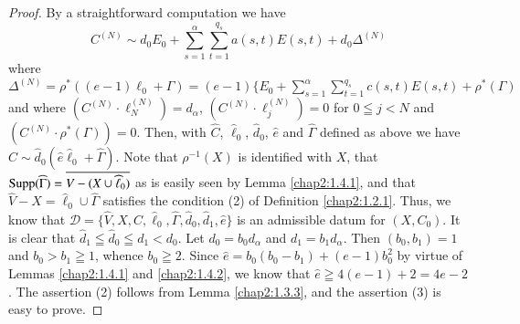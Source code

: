 \begin{proof}
By a straightforward computation we have
$$
C^{(N)}\sim
d_{0}E_{0}+\sum^{\alpha}_{s=1}\sum^{q_{s}}_{t=1}a(s,t)E(s,t)+d_{0}\Delta^{(N)}
$$
where
$\Delta^{(N)}=\rho^{\ast}((e-1)\ell_{0}+\Gamma)=(e-1)\{E_{0}+{\displaystyle{\mathop{\sum}^{\alpha}_{s=1}}\mathop{\sum}^{q_{s}}_{t=1}}c(s,t)E(s,t)+\rho^{\ast}(\Gamma)$
and where $(C^{(N)}\cdot\ell^{(N)}_{N})=d_{\alpha}$,
$(C^{(N)}\cdot\ell^{(N)}_{j})=0$ for $0\leqq j<N$ and $(C^{(N)}\cdot
\rho^{\ast}(\Gamma))=0$. Then, with $\widehat{C}$,
$\widehat{\ell}_{0}$, $\widehat{d}_{0}$, $\widehat{e}$ and
$\widehat{\Gamma}$ defined as above we have
$\widehat{C}\sim\widehat{d}_{0}(\widehat{e}\widehat{\ell}_{0}+\widehat{\Gamma})$. Note
that $\rho^{-1}(X)$ is identified with $X$, that
$\operatorname{Supp}(\widehat{\Gamma})=\overline{V-(X\cup \widehat{\ell}_{0})}$ as
is easily seen by Lemma \ref{chap2:1.4.1}, and that
$\widehat{V}-X=\widehat{\ell}_{0}\cup \widehat{\Gamma}$ satisfies the
condition (2) of Definition \ref{chap2:1.2.1}. Thus, we know that
$\widehat{\mathscr{D}}=\{\widehat{V},X,\widehat{C},\widehat{\ell}_{0},\widehat{\Gamma},\widehat{d}_{0},\widehat{d}_{1},\widehat{e}\}$
is an admissible datum for $(X,C_{0})$. It is clear that
$\widehat{d}_{1}\leqq \widehat{d}_{0}\leqq d_{1}<d_{0}$. Let
$d_{0}=b_{0}d_{\alpha}$ and $d_{1}=b_{1}d_{\alpha}$. Then
$(b_{0},b_{1})=1$ and $b_{0}>b_{1}\geqq 1$, whence $b_{0}\geqq
2$. Since $\widehat{e}=b_{0}(b_{0}-b_{1})+(e-1)b^{2}_{0}$ by virtue of
Lemmas \ref{chap2:1.4.1} and \ref{chap2:1.4.2}, we know that
$\widehat{e}\geqq 4(e-1)+2=4e-2$. The assertion (2) follows from Lemma
\ref{chap2:1.3.3}, and the assertion (3) is easy to prove.
\end{proof}

